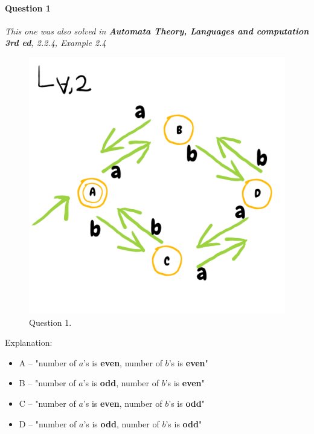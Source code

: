 \paragraph{Question 1}
\emph{This one was also solved in \textbf{Automata Theory, Languages and computation 3rd ed}, 2.2.4, Example 2.4}
\begin{figure}[!h]
    \centering
    \includegraphics[scale=0.3]{data/2018-W-2-1.png}
    \caption{Question 1.}
\end{figure}



Explanation:
\begin{itemize}
    \item A – "number of $a$'s is \textbf{even}, number of $b$'s is \textbf{even}"
    \item B – "number of $a$'s is \textbf{odd}, number of $b$'s is \textbf{even}"
    \item C – "number of $a$'s is \textbf{even}, number of $b$'s is \textbf{odd}"
    \item D – "number of $a$'s is \textbf{odd}, number of $b$'s is \textbf{odd}"
\end{itemize}


